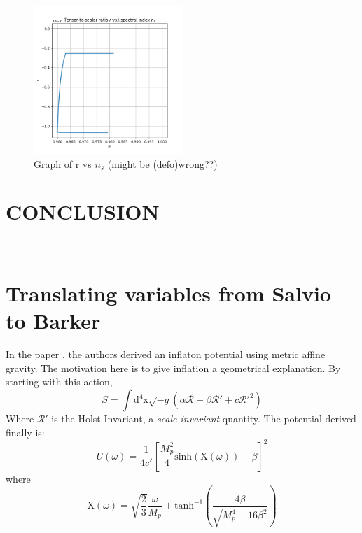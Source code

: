 \documentclass[aps,prd,reprint,preprintnumbers,showpacs,floatfix,nofootinbib,superscript address]{revtex4-2}
\begin{document}
\begin{figure}[h!]
    \centering
    \includegraphics[width=0.5\textwidth]{Python/Figures/ns vs r.png}
    \caption{Graph of r vs $n_s$ (might be (defo)wrong??)}
    \label{r vs n_s}
\end{figure}

\section{CONCLUSION}

\newpage
$\,$

\newpage

\appendix

\section{Translating variables from Salvio to Barker} \label{Appendix A}

In the paper \cite{Salvio_2022}, the authors derived an inflaton potential using metric affine gravity. The motivation here is to give inflation a geometrical explanation. 
By starting with this action, 
\begin{equation}
    S = \int \text{d}^4\text{x} \sqrt{-g} (\alpha \mathcal{R} + \beta \mathcal{R}' + c \mathcal{R}'^{2})
\end{equation}
Where $\mathcal{R}'$ is the Holst Invariant, a \textit{scale-invariant} quantity. The potential derived finally is: 
\begin{equation}
    U(\omega) = \frac{1}{4 c'} \left[ \frac{M_{p}^{2}}{4} \text{sinh}(\text{X}(\omega)) - \beta  \right]^2
\end{equation}
where
\begin{equation}
    \text{X}(\omega) = \sqrt{\frac{2}{3}} \frac{\omega}{M_{p}} + \text{tanh}^{-1} \left(\frac{4 \beta}{\sqrt{M_{p}^{4}+16 \beta^2}} \right)
\end{equation}
\end{document}
